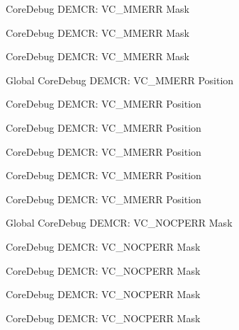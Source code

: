 \begin{DoxyRefList}
\label{deprecated__deprecated000430}%
%
Core\+Debug DEMCR\+: VC\+\_\+\+MMERR Mask 

\label{deprecated__deprecated000212}%
%
Core\+Debug DEMCR\+: VC\+\_\+\+MMERR Mask 

\label{deprecated__deprecated000519}%
%
Core\+Debug DEMCR\+: VC\+\_\+\+MMERR Mask  
\item[Global \doxylink{group___c_m_s_i_s___core_debug_ga444454f7c7748e76cd76c3809c887c41}{Core\+Debug\+\_\+\+DEMCR\+\_\+\+VC\+\_\+\+MMERR\+\_\+\+Pos} ]\label{deprecated__deprecated000620}%
%
Core\+Debug DEMCR\+: VC\+\_\+\+MMERR Position 

\label{deprecated__deprecated000353}%
%
Core\+Debug DEMCR\+: VC\+\_\+\+MMERR Position 

\label{deprecated__deprecated000067}%
%
Core\+Debug DEMCR\+: VC\+\_\+\+MMERR Position 

\label{deprecated__deprecated000518}%
%
Core\+Debug DEMCR\+: VC\+\_\+\+MMERR Position 

\label{deprecated__deprecated000429}%
%
Core\+Debug DEMCR\+: VC\+\_\+\+MMERR Position 

\label{deprecated__deprecated000211}%
%
Core\+Debug DEMCR\+: VC\+\_\+\+MMERR Position  
\item[Global \doxylink{group___c_m_s_i_s___core_debug_ga03ee58b1b02fdbf21612809034562f1c}{Core\+Debug\+\_\+\+DEMCR\+\_\+\+VC\+\_\+\+NOCPERR\+\_\+\+Msk} ]\label{deprecated__deprecated000619}%
%
Core\+Debug DEMCR\+: VC\+\_\+\+NOCPERR Mask 

\label{deprecated__deprecated000517}%
%
Core\+Debug DEMCR\+: VC\+\_\+\+NOCPERR Mask 

\label{deprecated__deprecated000428}%
%
Core\+Debug DEMCR\+: VC\+\_\+\+NOCPERR Mask 

\label{deprecated__deprecated000066}%
%
Core\+Debug DEMCR\+: VC\+\_\+\+NOCPERR Mask 

\label{deprecated__deprecated000352}%
%
Core\+Debug DEMCR\+: VC\+\_\+\+NOCPERR Mask 


\end{DoxyRefList}

